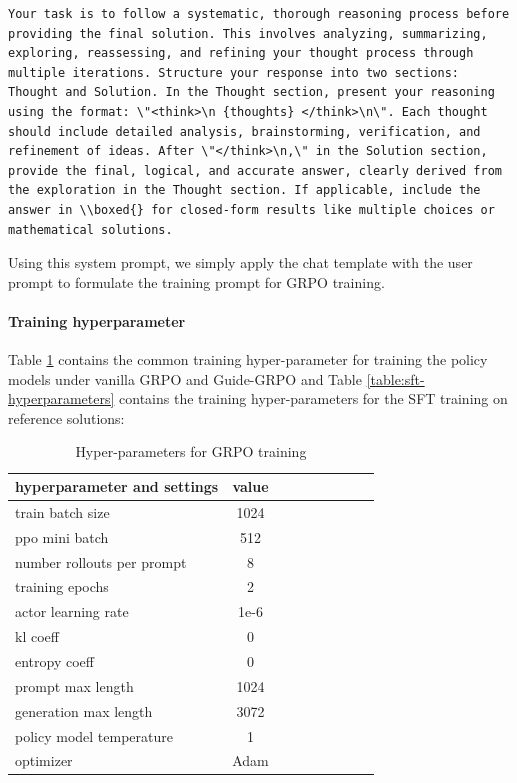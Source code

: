 \documentclass{article}
\begin{document}
{\begin{Verbatim}[breaklines=true]
Your task is to follow a systematic, thorough reasoning process before providing the final solution. This involves analyzing, summarizing, exploring, reassessing, and refining your thought process through multiple iterations. Structure your response into two sections: Thought and Solution. In the Thought section, present your reasoning using the format: \"<think>\n {thoughts} </think>\n\". Each thought should include detailed analysis, brainstorming, verification, and refinement of ideas. After \"</think>\n,\" in the Solution section, provide the final, logical, and accurate answer, clearly derived from the exploration in the Thought section. If applicable, include the answer in \\boxed{} for closed-form results like multiple choices or mathematical solutions.
\end{Verbatim}

Using this system prompt, we simply apply the chat template with the user prompt to formulate the training prompt for GRPO training. 

\paragraph{Training hyperparameter} \label{app:guide_training_details} Table \ref{table:grpo-hyperparameters} contains the common training hyper-parameter for training the policy models under vanilla GRPO and Guide-GRPO and Table \ref{table:sft-hyperparameters} contains the training hyper-parameters for the SFT training on reference solutions:

\begin{table}[H]
\centering
\begin{tabular}{lcccccccc}
\toprule
{hyperparameter and settings} & {value} \\
\midrule
train batch size & 1024 \\
ppo mini batch & 512 \\
number rollouts per prompt & 8 \\
training epochs & 2 \\
actor learning rate & 1e-6 \\
kl coeff & 0 \\
entropy coeff & 0 \\
prompt max length & 1024 \\
generation max length & 3072 \\
policy model temperature & 1 \\
optimizer & Adam \\
\bottomrule
\end{tabular}
\vspace{0.3em}
\caption{Hyper-parameters for GRPO training}
\label{table:grpo-hyperparameters}
\end{table}

}
\end{document}
